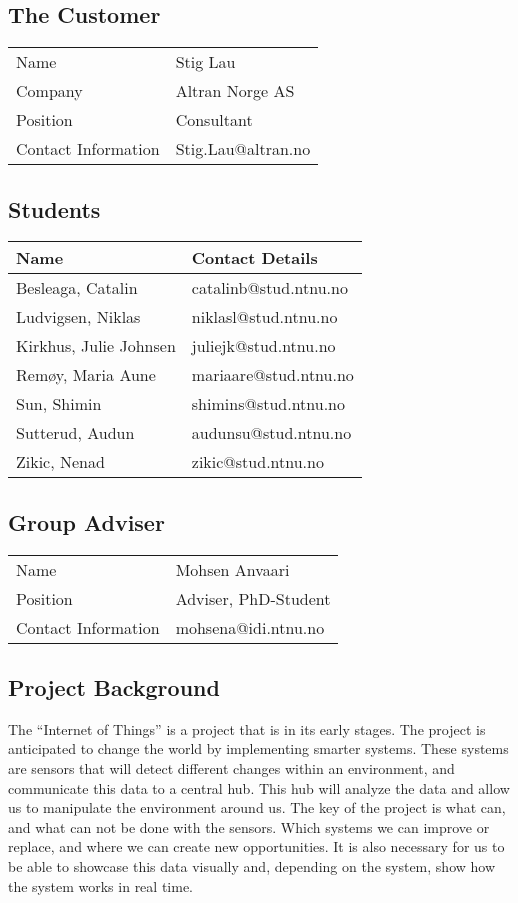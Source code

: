 \documentclass[../document.tex]{subfiles}
\begin{document}
\subsection*{The Customer}
\begin{tabular}{ll}
\hline
Name					&	Stig Lau\\
Company				&	Altran Norge AS\\
Position				&	Consultant\\
Contact Information		&	Stig.Lau@altran.no\\
\hline
\end{tabular}

\subsection*{Students}
\begin{tabular}{ll}
\hline
Name				&	Contact Details\\ \hline
Besleaga, Catalin		&	catalinb@stud.ntnu.no\\
Ludvigsen, Niklas		&	niklasl@stud.ntnu.no\\
Kirkhus, Julie Johnsen	&	juliejk@stud.ntnu.no\\
Remøy, Maria Aune		&	mariaare@stud.ntnu.no\\
Sun, Shimin			&	shimins@stud.ntnu.no\\
Sutterud, Audun		&	audunsu@stud.ntnu.no\\
Zikic, Nenad			&	zikic@stud.ntnu.no\\
\hline
\end{tabular}

\subsection*{Group Adviser}
\begin{tabular}{ll}
\hline
Name				&	Mohsen Anvaari\\
Position			&	Adviser, PhD-Student\\
Contact Information	&	mohsena@idi.ntnu.no\\
\hline
\end{tabular}

\subsection*{Project Background}
The “Internet of Things” is a project that is in its early stages. The project is anticipated to change the world by implementing smarter systems. These systems are sensors that will detect different changes within an environment, and communicate this data to a central hub. This hub will analyze the data and allow us to manipulate the environment around us. The key of the project is what can, and what can not be done with the sensors. Which systems we can improve or replace, and where we can create new opportunities. It is also necessary for us to be able to showcase this data visually and, depending on the system, show how the system works in real time.
\end{document}
